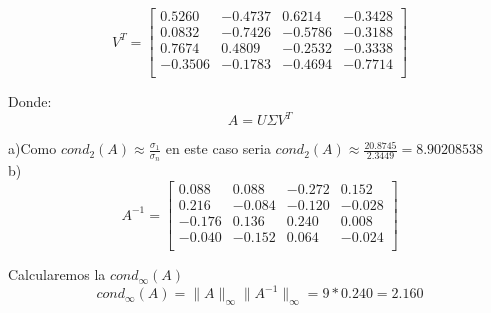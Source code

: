 \documentclass[a4paper,12pt]{article}
\begin{document}
\begin{equation*}
V^T = \begin{bmatrix}
0.5260 & -0.4737 & 0.6214 & -0.3428 \\
0.0832 & -0.7426 & -0.5786 & -0.3188 \\
0.7674 & 0.4809 & -0.2532 & -0.3338 \\
-0.3506 & -0.1783 & -0.4694 & -0.7714 \\
\end{bmatrix}
\end{equation*}

Donde: \[ A=U\Sigma V^T \]

a)Como $ {cond}_2(A) \approx \frac{\sigma_1}{\sigma_n}$ en este caso seria ${cond}_2(A) \approx \frac{20.8745 }{2.3449 }=8.90208538$\\

b)
\begin{equation*}
A^{-1} = \begin{bmatrix}
 0.088 & 0.088 & -0.272 & 0.152 \\
 0.216 & -0.084 & -0.120 & -0.028 \\
 -0.176 & 0.136 & 0.240 & 0.008 \\
 -0.040 & -0.152 & 0.064 & -0.024 \\
\end{bmatrix}    
\end{equation*}

Calcularemos la $cond_\infty(A)$
\[cond_\infty(A)=\|A\|_\infty\|A^{-1}\|_\infty=9*0.240=2.160\]



\end{document}
